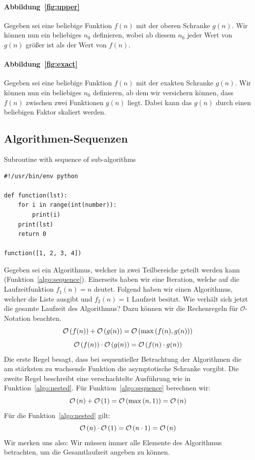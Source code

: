 \paragraph{Abbildung~\ref{fig:upper}}
Gegeben sei eine beliebige Funktion $f(n)$ mit der oberen Schranke $g(n)$. Wir können nun ein beliebiges $n_0$ definieren, wobei ab diesem $n_0$ jeder Wert von $g(n)$ größer ist als der Wert von $f(n)$.

\paragraph{Abbildung~\ref{fig:exact}}
Gegeben sei eine beliebige Funktion $f(n)$ mit der exakten Schranke $g(n)$. Wir können nun ein beliebiges $n_0$ definieren, ab dem wir versichern können, dass $f(n)$ zwischen zwei Funktionen $g(n)$ liegt. Dabei kann das $g(n)$ durch einen beliebigen Faktor skaliert werden.

\subsection{Algorithmen-Sequenzen}
%
\begin{algorithm}
\caption{Subroutine with sequence of sub-algorithms}
\label{algo:sequence}
\begin{lstlisting}
#!/usr/bin/env python

def function(lst):
    for i in range(int(number)):
        print(i)
    print(lst)
    return 0

function([1, 2, 3, 4])
\end{lstlisting}
\end{algorithm}
%
Gegeben sei ein Algorithmus, welcher in zwei Teilbereiche geteilt werden kann (Funktion~\ref{algo:sequence}).
Einerseits haben wir eine Iteration, welche auf die Laufzeitfunktion $f_1(n) = n$ deutet.
Folgend haben wir einen Algorithmus, welcher die Liste ausgibt und $f_2(n) = 1$ Laufzeit besitzt.
Wie verhält sich jetzt die gesamte Laufzeit des Algorithmus? Dazu können wir die Rechenregeln für $\mathcal{O}$-Notation beachten.
%
\[
  \mathcal{O}\left(f(n)\right) + \mathcal{O}\left(g(n)\right) = \mathcal{O}\left(\max\left(f(n), g(n)\right)\right)
\] \[
  \mathcal{O}\left(f(n)\right) \cdot \mathcal{O}\left(g(n)\right) = \mathcal{O}\left(f(n) \cdot g(n)\right)
\]
%
Die erste Regel besagt, dass bei sequentieller Betrachtung der Algorithmen die am stärksten zu wachsende Funktion die asymptotische Schranke vorgibt. Die zweite Regel beschreibt eine verschachtelte Ausführung wie in Funktion~\ref{algo:nested}. Für Funktion~\ref{algo:sequence} berechnen wir:
%
\[
  \mathcal{O}\left(n\right) + \mathcal{O}\left(1\right) = \mathcal{O}\left(\max\left(n, 1\right)\right) = \mathcal{O}\left(n\right)
\]
Für die Funktion~\ref{algo:nested} gilt:
\[
  \mathcal{O}\left(n\right) \cdot \mathcal{O}\left(1\right) = \mathcal{O}\left(n \cdot 1\right) = \mathcal{O}\left(n\right)
\]
%
Wir merken uns also: Wir müssen immer alle Elemente des Algorithmus betrachten, um die Gesamtlaufzeit angeben zu können.

